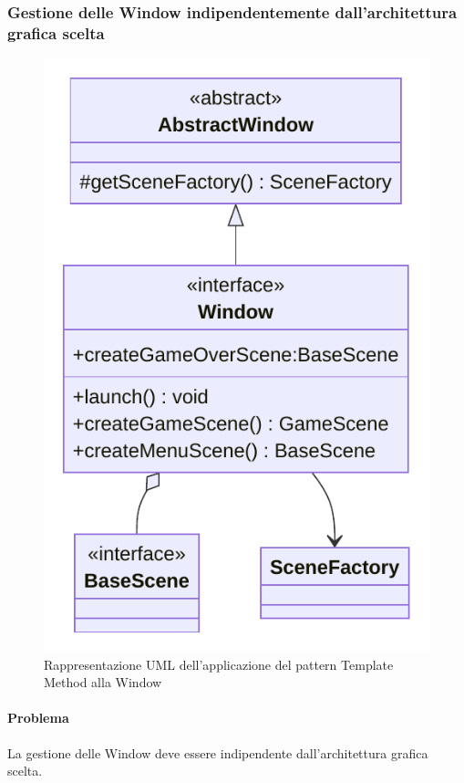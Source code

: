 \documentclass[a4paper,12pt]{report}
\begin{document}
\subsubsection{Gestione delle Window indipendentemente dall'architettura grafica scelta}

\begin{figure}[H]
\centering{}
\includegraphics[scale=0.75]{img/WindowUML}
\caption{Rappresentazione UML dell'applicazione del pattern Template Method alla Window}
\label{img:window}
\end{figure}

\paragraph{Problema} La gestione delle Window deve essere indipendente dall'architettura grafica scelta.
\end{document}
